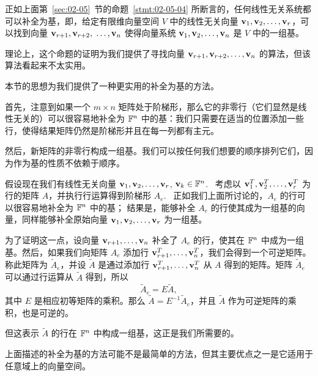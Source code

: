 正如上面第~\ref{sec:02-05}~节的命题~\ref{stmt:02-05-04} 所断言的，任何线性无关系统都可以补全为基，即，给定有限维向量空间 $V$ 中的线性无关向量 $\mathbf{v}_1, \mathbf{v}_2, \dots, \mathbf{v}_r$，可以找到向量 $\mathbf{v}_{r+1}, \mathbf{v}_{r+2},$ $ \dots, \mathbf{v}_n$ 使得向量系统 $\mathbf{v}_1, \mathbf{v}_2, \dots, \mathbf{v}_n$ 是 $V$ 中的一组基。

理论上，这个命题的证明为我们提供了寻找向量 $\mathbf{v}_{r+1}, \mathbf{v}_{r+2}, \dots, \mathbf{v}_n$ 的算法，但该算法看起来不太实用。

本节的思想为我们提供了一种更实用的补全为基的方法。

首先，注意到如果一个 $m \times n$ 矩阵处于阶梯形，那么它的非零行（它们显然是线性无关的）可以很容易地补全为 $\mathbb{F}^n$ 中的基：我们只需要在适当的位置添加一些行，使得结果矩阵仍然是阶梯形并且在每一列都有主元。

然后，新矩阵的非零行构成一组基。我们可以按任何我们想要的顺序排列它们，因为作为基的性质不依赖于顺序。

假设现在我们有线性无关向量 $\mathbf{v}_1, \mathbf{v}_2, \dots, \mathbf{v}_r$, $\mathbf{v}_k \in \mathbb{F}^n$. ~考虑以 $\mathbf{v}_1^T, \mathbf{v}_2^T, \dots, \mathbf{v}_r^T$ 为行的矩阵 $A$，并执行行运算得到阶梯形 $A_e$. ~正如我们上面所讨论的，$A_e$ 的行可以很容易地补全为 $\mathbb{F}^n$ 中的基；
结果是，能够补全 $A_e$ 的行使其成为一组基的向量，同样能够补全原始向量 $\mathbf{v}_1, \mathbf{v}_2, \dots, \mathbf{v}_r$ 为一组基。

为了证明这一点，设向量 $\mathbf{v}_{r+1}, \dots, \mathbf{v}_n$ 补全了 $A_e$ 的行，使其在 $\mathbb{F}^n$ 中成为一组基。然后，如果我们向矩阵 $A_e$ 添加行 $\mathbf{v}_{r+1}^T, \dots, \mathbf{v}_n^T$，我们会得到一个可逆矩阵。称此矩阵为 $\widetilde{A}_e$，并设 $\widetilde{A}$ 是通过添加行 $\mathbf{v}_{r+1}^T, \dots, \mathbf{v}_n^T$ 从 $A$ 得到的矩阵。矩阵 $\widetilde{A}_e$ 可以通过行运算从 $\widetilde{A}$ 得到，所以
$$
\widetilde{A}_e = E \widetilde{A},
$$
其中 $E$ 是相应初等矩阵的乘积。那么 $\widetilde{A} = E^{-1}\widetilde{A}_e$，并且 $\widetilde{A}$ 作为可逆矩阵的乘积，也是可逆的。

但这表示 $\widetilde{A}$ 的行在 $\mathbb{F}^n$ 中构成一组基，这正是我们所需要的。



\begin{remark*}
上面描述的补全为基的方法可能不是最简单的方法，但其主要优点之一是它适用于任意域上的向量空间。
\end{remark*}


